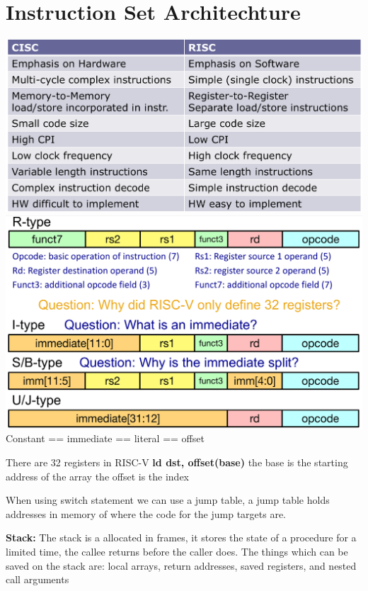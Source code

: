 \section{Instruction Set Architechture}
\includegraphics[width=\linewidth]{png/risc.png}
\includegraphics[width=\linewidth]{png/isa.png}
Constant == immediate == literal == offset

There are 32 registers in RISC-V
\textbf{ld dst, offset(base)} the base is the starting address of the array the
offset is the index

When using switch statement we can use a jump table, a jump table holds addresses
in memory of where the code for the jump targets are.

\textbf{Stack:} The stack is a allocated in frames, it stores the state of a
procedure for a limited time, the callee returns before the caller does. The
things which can be saved on the stack are: local arrays, return addresses,
saved registers, and nested call arguments


